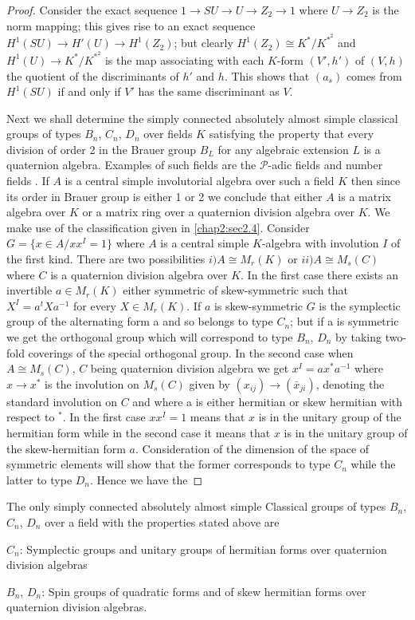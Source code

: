 \begin{proof}
Consider the exact sequence $1 \rightarrow SU \rightarrow U
\rightarrow Z_2 \rightarrow 1$ where $U \rightarrow Z_2$ is the norm
mapping; this gives rise to an exact sequence $H^1 (SU) \rightarrow
H'(U) \rightarrow H^1(Z_2)$; but clearly $ H^1(Z_2) \cong
K^*/K^{*^2}$ and\break $H^1 (U) \rightarrow K^*/K^{*^2}$ is the map
associating with each $K$-form $(V', h')$ of $(V,h)$ the quotient of
the discriminants of $h'$ and $h$. This shows that $(a_s)$ comes from
$H^1 (SU)$ if and only  if $V'$ has the same discriminant as $V$. 

Next we shall determine the simply connected absolutely almost simple
classical groups of types $B_n$, $C_n$, $D_n$ over fields $K$ satisfying
the property that every division of order 2 in the Brauer group
$B_L$ for any algebraic extension $L$ is a quaternion
algebra. Examples of such fields are the $\mathscr{P}$-adic fields and
number fields \cite{keyDe}. If $A$ is a central simple involutorial algebra
over such a field $K$ then since its order in Brauer group is either
1 or 2 we conclude that either $A$ is a matrix algebra over $K$ or
a matrix ring over a quaternion division algebra over $K$. We make use
of the classification given in \ref{chap2:sec2.4}. Consider $G=\{ x \in A/
xx^I=1\}$ where $A$ is a central simple $K$-algebra with\pageoriginale
involution $I$ of the first kind. There are two possibilities $i) A
\cong M_r (K) $ or $ ii) A \cong M_s(C)$ where $C$ is
a quaternion 
division algebra over $K$. In the first case there exists an
invertible $a \in M_r(K)$ either symmetric of skew-symmetric such
that $X^I =a^t X a^{-1}$ for every $X \in M_r(K)$. If $a$ is
skew-symmetric $G$ is the symplectic group of the alternating form a
and so belongs to type $C_n$; but if a is symmetric we get the
orthogonal group which will correspond to type $B_n$, $D_n$ by taking
two-fold coverings of the special orthogonal group. In the second
case when $A \cong M_s(C)$, $C$ being quaternion division algebra
we get $x^I = ax^* a^{-1}$ where $x \rightarrow x^*$ is the involution
on $M_s (C)$ given by $(x_{ij}) \rightarrow (\bar{x}_{ji})$, denoting
the standard involution on $C$ and where a is either hermitian or skew
hermitian with  respect to $^*$. In the first case $xx^I =1$ means that $x$
is in the unitary group of the hermitian form while in the second case
it means that $x$ is in the unitary group of the skew-hermitian form
$a$. Consideration of the dimension of the space of symmetric elements
will show that the former corresponds to type $C_n$ while the latter
to type $D_n$. Hence we have the  
\end{proof}

\begin{theorem*}%
The only simply connected absolutely almost simple Classical groups of
types $B_n$, $C_n$, $D_n$ over a field with the properties stated above
are 

\noindent
$C_n$: Symplectic groups and unitary groups of hermitian forms over
qua\-ternion division algebras 

\noindent
$B_n$, $D_n $: Spin groups of quadratic forms and of skew hermitian
for\-ms over quaternion division algebras. 
\end{theorem*}


